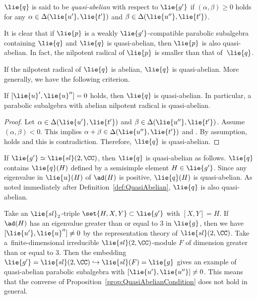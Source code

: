 \begin{Definition}\label{def:QuasiAbelian}
	$\lie{q}$ is said to be \emph{quasi-abelian} with respect to $\lie{g'}$ if
	$(\alpha, \beta)\geq 0$ holds for any $\alpha \in \Delta(\lie{u'}, \lie{t'})$ and $\beta \in \Delta(\lie{u''}, \lie{t'})$.
\end{Definition}

It is clear that if $\lie{p}$ is a weakly $\lie{g'}$-compatible parabolic subalgebra containing $\lie{q}$ and $\lie{q}$ is quasi-abelian, then $\lie{p}$ is also quasi-abelian.
In fact, the nilpotent radical of $\lie{p}$ is smaller than that of~$\lie{q}$.

If the nilpotent radical of $\lie{q}$ is abelian, $\lie{q}$ is quasi-abelian.
More generally, we have the following criterion.

\begin{Proposition}\label{prop:QuasiAbelianCondition}
	If $[\lie{u}', \lie{u}'']=0$ holds, then $\lie{q}$ is quasi-abelian.
	In particular, a parabolic subalgebra with abelian nilpotent radical is quasi-abelian.
\end{Proposition}
	
\begin{proof}
	Let $\alpha \in \Delta(\lie{u'}, \lie{t'})$ and $\beta \in \Delta(\lie{u''}, \lie{t'})$.
	Assume $(\alpha, \beta) < 0$.
	This implies $\alpha + \beta \in \Delta(\lie{u''}, \lie{t'})$
	and .
	By assumption,  holds and this is contradiction.
	Therefore, $\lie{q}$ is quasi-abelian.
\end{proof}

\begin{Example}
	If $\lie{g'} \simeq \lie{sl}(2,\CC)$, then $\lie{q}$ is quasi-abelian as follows.
	$\lie{q}$ contains $\lie{q}(H)$ defined by a semisimple element $H\in \lie{g'}$.
	Since any eigenvalue in $\lie{u}(H)$ of $\ad(H)$ is positive, $\lie{q}(H)$ is quasi-abelian.
	As noted immediately after Definition~\ref{def:QuasiAbelian}, $\lie{q}$ is also quasi-abelian.

	Take an $\lie{sl}_2$-triple $\set{H, X, Y}\subset \lie{g'}$ with $[X, Y] = H$.
	If $\ad(H)$ has an eigenvalue greater than or equal to $3$ in $\lie{g}$, then we have $[\lie{u'}, \lie{u}''] \neq 0$
	by the representation theory of $\lie{sl}(2,\CC)$.
	Take a~finite-dimensional irreducible $\lie{sl}(2,\CC)$-module $F$ of dimension greater than or equal to $3$.
	Then the embedding $\lie{g'} = \lie{sl}(2,\CC) \hookrightarrow \lie{sl}(F) = \lie{g}$ gives an example
	of quasi-abelian parabolic subalgebra with $[\lie{u'}, \lie{u''}] \neq 0$.
	This means that the converse of Proposition~\ref{prop:QuasiAbelianCondition} does not hold in general.
\end{Example}


